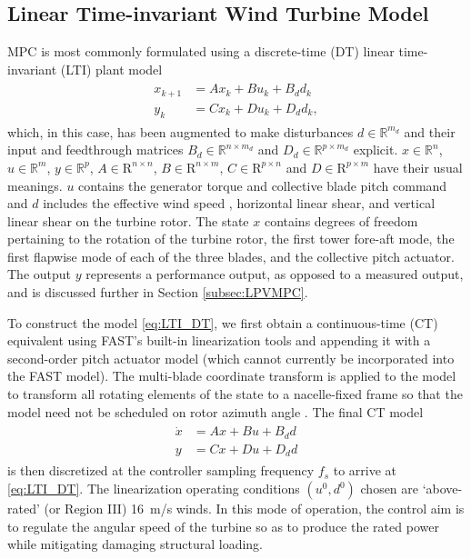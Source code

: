 \documentclass[letterpaper, 10 pt, conference]{ieeeconf}  %
\begin{document}
\subsection{Linear Time-invariant Wind Turbine Model}\label{subsec:LTImodel}

MPC is most commonly formulated using a discrete-time (DT) linear time-invariant (LTI) plant model
\begin{align}\label{eq:LTI_DT}
\begin{split}
x_{k+1} &= Ax_{k} + Bu_{k} + B_d d_k \\
y_k &= Cx_k + Du_k + D_d d_k,
\end{split}
\end{align}
which, in this case, has been augmented to make disturbances $d\in\mathbb{R}^{m_d}$ and their input and feedthrough matrices $B_d\in\mathbb{R}^{n\times m_d}$ and $D_d\in\mathbb{R}^{p\times m_d}$ explicit. $x\in\mathbb{R}^n$, $u\in\mathbb{R}^m$, $y\in\mathbb{R}^p$, $A \in \mathrm{R}^{n\times n}$, $B\in \mathrm{R}^{n\times m}$, $C\in \mathrm{R}^{p\times n}$ and $D\in \mathrm{R}^{p\times m}$ have their usual meanings. $u$ contains the generator torque and collective blade pitch command and  $d$ includes the effective wind speed \cite{SimleyPao_roteff2013}, horizontal linear shear, and vertical linear shear on the turbine rotor. The state $x$ contains degrees of freedom pertaining to the rotation of the turbine rotor, the first tower fore-aft mode, the first flapwise mode of each of the three blades, and the collective pitch actuator. The output $y$ represents a performance output, as opposed to a measured output, and is discussed further in Section \ref{subsec:LPVMPC}.

To construct the model \eqref{eq:LTI_DT}, we first obtain a continuous-time (CT) equivalent using FAST's built-in linearization tools and appending it with a second-order pitch actuator model (which cannot currently be incorporated into the FAST model). The multi-blade coordinate transform is applied to the model to transform all rotating elements of the state to a nacelle-fixed frame so that the model need not be scheduled on rotor azimuth angle \cite{Bir2008}. The final CT model
\begin{align}\label{eq:LTI_CT}
\begin{split}
\dot{x} &= Ax + Bu + B_d d \\
y &= Cx + Du + D_d d
\end{split}
\end{align}
is then discretized at the controller sampling frequency $f_s$ to arrive at \eqref{eq:LTI_DT}. The linearization operating conditions $(u^0, d^0)$ chosen are `above-rated' (or Region III) 16~m/s winds. In this mode of operation, the control aim is to regulate the angular speed of the turbine so as to produce the rated power while mitigating damaging structural loading.
\end{document}
